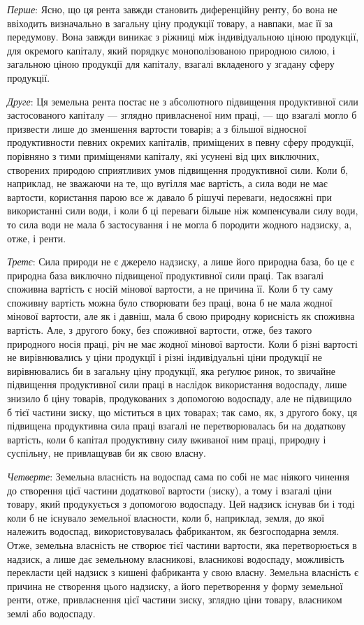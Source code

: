 \emph{Перше}: Ясно, що ця рента завжди становить диференційну ренту, бо
вона не ввіходить визначально в загальну ціну продукції товару, а навпаки,
має її за передумову. Вона завжди виникає з ріжниці між індивідуальною
ціною продукції, для окремого капіталу, який порядкує монополізованою природною
силою, і загальною ціною продукції для капіталу, взагалі вкладеного у згадану
сферу продукції.

\emph{Друге}: Ця земельна рента постає не з абсолютного підвищення продуктивної
сили застосованого капіталу — зглядно привласненої ним праці, —
що взагалі могло б призвести лише до зменшення вартости товарів; а
з більшої відносної продуктивности певних окремих капіталів, приміщених
в певну сферу продукції, порівняно з тими приміщенями капіталу, які усунені
від цих виключних, створених природою сприятливих умов підвищення
продуктивної сили. Коли б, наприклад, не зважаючи на те, що вугілля має вартість,
а сила води не має вартости, користання парою все ж давало б рішучі
переваги, недосяжні при використанні сили води, і коли б ці переваги більше
ніж компенсували силу води, то сила води не мала б застосування і не могла б
породити жодного надзиску, а, отже, і ренти.

\emph{Третє}: Сила природи не є джерело надзиску, а лише його природна
база, бо це є природна база виключно підвищеної продуктивної сили праці. Так
взагалі споживна вартість є носій мінової вартости, а не причина її. Коли б
ту саму споживну вартість можна було створювати без праці, вона б не мала
жодної мінової вартости, але як і давніш, мала б свою природну корисність
як споживна вартість. Але, з другого боку, без споживної вартости, отже,
без такого природного носія праці, річ не має жодної мінової вартости. Коли б
різні вартості не вирівнювались у ціни продукції і різні індивідуальні ціни
продукції не вирівнювались би в загальну ціну продукції, яка реґулює ринок,
то звичайне підвищення продуктивної сили праці в наслідок використання водоспаду,
лише знизило б ціну товарів, продукованих з допомогою водоспаду, але
не підвищило б тієї частини зиску, що міститься в цих товарах; так само, як,
з другого боку, ця підвищена продуктивна сила праці взагалі не перетворювалась
би на додаткову вартість, коли б капітал продуктивну силу вживаної ним
праці, природну і суспільну, не привлащував би як свою власну.

\emph{Четверте}: Земельна власність на водоспад сама по собі не має ніякого
чинення до створення цієї частини додаткової вартости (зиску), а тому і взагалі
ціни товару, який продукується з допомогою водоспаду. Цей надзиск існував
би і тоді коли б не існувало земельної власности, коли б, наприклад,
земля, до якої належить водоспад, використовувалась фабрикантом, як безгосподарна
земля. Отже, земельна власність не створює тієї частини вартости,
яка перетворюється в надзиск, а лише дає земельному власникові, власникові
водоспаду, можливість перекласти цей надзиск з кишені фабриканта у свою
власну. Земельна власність є причина не створення цього надзиску, а його
перетворення у форму земельної ренти, отже, привласнення цієї частини зиску,
зглядно ціни товару, власником землі або водоспаду.

